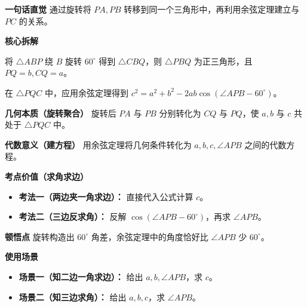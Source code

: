 \begin{explanationbox}
	\textbf{\textcolor{CExplanation}{一句话直觉}}
	通过旋转将 $PA,PB$ 转移到同一个三角形中，再利用余弦定理建立与 $PC$ 的关系。

	\medskip
	\textbf{\textcolor{CExplanation}{核心拆解}}
	\begin{description}[style=nextline, leftmargin=2.8em, labelsep=0.5em, itemsep=0.45em]
		\item[\textbf{要点一（旋转构造）：}]
			将 $\triangle ABP$ 绕 $B$ 旋转 $60^\circ$ 得到 $\triangle CBQ$，则 $\triangle PBQ$ 为正三角形，且 $PQ=b, CQ=a$。
		\item[\textbf{要点二（余弦定理）：}]
			在 $\triangle PQC$ 中，应用余弦定理得到 $c^2 = a^2+b^2-2ab\cos(\angle APB-60^\circ)$。
	\end{description}

	\medskip
	\textbf{\textcolor{CExplanation}{几何本质（旋转聚合）}}
	旋转后 $PA$ 与 $PB$ 分别转化为 $CQ$ 与 $PQ$，使 $a,b$ 与 $c$ 共处于 $\triangle PQC$ 中。

	\medskip
	\textbf{\textcolor{CExplanation}{代数意义（建方程）}}
	用余弦定理将几何条件转化为 $a,b,c,\angle APB$ 之间的代数方程。

	\medskip
	\textbf{\textcolor{CExplanation}{考点价值（求角求边）}}
	\begin{itemize}[leftmargin=*, itemsep=0.5em, topsep=0.4em]
		\item \textbf{考法一（两边夹一角求边）：} 直接代入公式计算 $c$。
		\item \textbf{考法二（三边反求角）：} 反解 $\cos(\angle APB-60^\circ)$，再求 $\angle APB$。
	\end{itemize}

	\medskip
	\textbf{\textcolor{CExplanation}{顿悟点}}
	旋转构造出 $60^\circ$ 角差，余弦定理中的角度恰好比 $\angle APB$ 少 $60^\circ$。

	\medskip
	\textbf{\textcolor{CExplanation}{使用场景}}
	\begin{itemize}[leftmargin=*, itemsep=0.5em, topsep=0.4em]
		\item \textbf{场景一（知二边一角求边）：} 给出 $a,b,\angle APB$，求 $c$。
		\item \textbf{场景二（知三边求角）：} 给出 $a,b,c$，求 $\angle APB$。
	\end{itemize}

\end{explanationbox}
